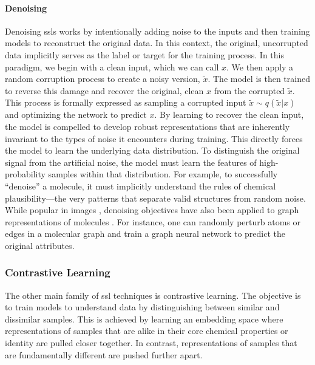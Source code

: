 \paragraph{Denoising}
\label{sec:denoising}
Denoising \glspl{ssl} works by intentionally adding noise to the inputs and then training models to reconstruct the original data. In this context, the original, uncorrupted data implicitly serves as the label or target for the training process.  In this paradigm, we begin with a clean input, which we can call $x$. We then apply a random corruption process to create a noisy version, $\tilde{x}$. 
The model is then trained to reverse this damage and recover the original, clean $x$ from the corrupted $\tilde{x}$. 
This process is formally expressed as sampling a corrupted input $\tilde{x}\sim q(\tilde{x}|x)$ and optimizing the network to predict $x$. \autocite{vincent2010stacked}
By learning to recover the clean input, the model is compelled to develop robust representations that are inherently invariant to the types of noise it encounters during training.  
This directly forces the model to learn the underlying data distribution.  
To distinguish the original signal from the artificial noise, the model must learn the features of high-probability samples within that distribution. 
For example, to successfully \enquote{denoise} a molecule, it must implicitly understand the rules of chemical plausibility---the very patterns that separate valid structures from random noise.  
While popular in images \autocite{vincent2008extracting, bengio2013generalized}, denoising objectives have also been applied to graph representations of molecules \autocite{wang2023denoise, ni2024pre}. 
For instance, one can randomly perturb atoms or edges in a molecular graph and train a graph neural network to predict the original attributes. 


\subsubsection{Contrastive Learning}
\label{sec:contrastive_learning}
The other main family of \gls{ssl} techniques is contrastive learning. The objective is to train models to understand data by distinguishing between similar and dissimilar samples. 
This is achieved by learning an embedding space where representations of samples that are alike in their core chemical properties or identity are pulled closer together. In contrast, representations of samples that are fundamentally different are pushed further apart. \autocite{hadsell2006dimensionality}

